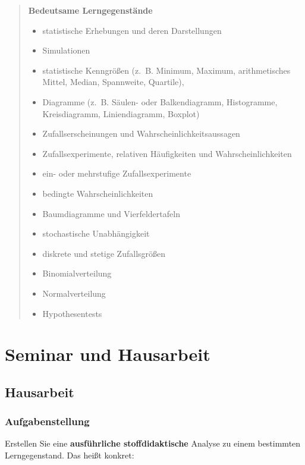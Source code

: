 \documentclass[
]{scrbook}
\providecommand{\tightlist}{%
  \setlength{\itemsep}{0pt}\setlength{\parskip}{0pt}}
\theoremstyle{definition}
\theoremstyle{definition}
\theoremstyle{definition}
\theoremstyle{definition}
\theoremstyle{remark}
\begin{document}
\begin{quote}
\textbf{Bedeutsame Lerngegenstände}

\begin{itemize}
\tightlist
\item
  statistische Erhebungen und deren Darstellungen
\item
  Simulationen
\item
  statistische Kenngrößen (z.~B. Minimum, Maximum, arithmetisches Mittel, Median, Spannweite, Quartile),
\item
  Diagramme (z.~B. Säulen- oder Balkendiagramm, Histogramme, Kreisdiagramm, Liniendiagramm, Boxplot)
\item
  Zufallserscheinungen und Wahrscheinlichkeitsaussagen
\item
  Zufallsexperimente, relativen Häufigkeiten und Wahrscheinlichkeiten
\item
  ein- oder mehrstufige Zufallsexperimente
\item
  bedingte Wahrscheinlichkeiten
\item
  Baumdiagramme und Vierfeldertafeln
\item
  stochastische Unabhängigkeit
\item
  diskrete und stetige Zufallsgrößen
\item
  Binomialverteilung
\item
  Normalverteilung
\item
  Hypothesentests
\end{itemize}
\end{quote}

\hypertarget{appendix-anhang}{%
\appendix}


\hypertarget{seminar-und-hausarbeit}{%
\chapter{Seminar und Hausarbeit}\label{seminar-und-hausarbeit}}

\hypertarget{hausarbeit}{%
\section{Hausarbeit}\label{hausarbeit}}

\hypertarget{aufgabenstellung}{%
\subsection{Aufgabenstellung}\label{aufgabenstellung}}

Erstellen Sie eine \textbf{ausführliche stoffdidaktische} Analyse zu einem bestimmten Lerngegenstand. Das heißt konkret:
\end{document}
